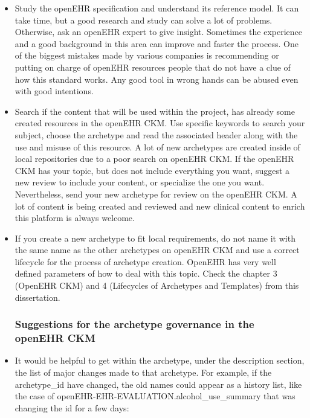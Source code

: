 \documentclass[mim_thesis.tex]{subfiles}
\begin{document}
\begin{itemize}
\item Study the openEHR specification and understand its reference model. It can take time, but a good research and study can solve a lot of problems. Otherwise, ask an openEHR expert to give insight. Sometimes the experience and a good background in this area can improve and faster the process. One of the biggest mistakes made by various companies is recommending or putting on charge of openEHR resources people that do not have a clue of how this standard works. Any good tool in wrong hands can be abused even with good intentions.

\item Search if the content that will be used within the project, has already some created resources in the openEHR CKM. Use specific keywords to search your subject, choose the archetype and read the associated header along with the use and misuse of this resource. A lot of new archetypes are created inside of local repositories due to a poor search on openEHR CKM. If the openEHR CKM has your topic, but does not include everything you want, suggest a new review to include your content, or specialize the one you want. Nevertheless, send your new archetype for review on the openEHR CKM. A lot of content is being created and reviewed and new clinical content to enrich this platform is always welcome. 

\item If you create a new archetype to fit local requirements, do not name it with the same name as the other archetypes on openEHR CKM and use a correct lifecycle for the process of archetype creation. OpenEHR has very well defined parameters of how to deal with this topic. Check the chapter 3 (OpenEHR CKM) and 4 (Lifecycles of Archetypes and Templates) from this dissertation.  


\subsubsection{Suggestions for the archetype governance in the openEHR CKM}

\item It would be helpful to get within the archetype, under the description section, the list of major changes made to that archetype. For example, if the archetype\_id have changed, the old names could appear as a history list, like the case of openEHR-EHR-EVALUATION.alcohol\_use\_summary that was changing the id for a few days:


\end{itemize}
\end{document}
